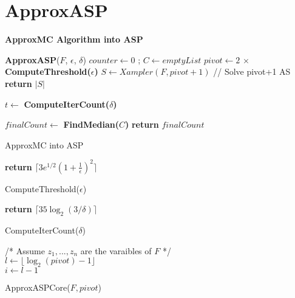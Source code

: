 \section{ApproxASP}

\textbf{ApproxMC Algorithm into ASP}

\begin{algorithm}[h]
\textbf{ApproxASP}($F$, $\epsilon$, $\delta$) \;
\SetAlgoLined
{}
 $counter \gets 0$ ; $C \gets emptyList$\;
 $pivot \gets  2 \, \times $ \textbf{ComputeThreshold($\epsilon$)} \;
 $S \gets Xampler(F, pivot + 1)$ // {Solve pivot+1 AS}  \;
 { %
 \textbf{return} $|S|$  
 } %
 { %
 $t \gets $ \textbf{ComputeIterCount($\delta$)} 
 
 } %
 $finalCount \gets $ \textbf{FindMedian($C$)} \;
 \textbf{return} $finalCount$
 
 \caption{ApproxMC into ASP}
\end{algorithm}


\begin{algorithm}
\textbf{return} $\lceil 3 e^{1/2} (1 + \frac{1}{\epsilon})^2 \rceil$
\caption{ComputeThreshold($\epsilon$)}
\end{algorithm}

\begin{algorithm}
\textbf{return} $\lceil 35 \log_2 (3/\delta) \rceil$
\caption{ComputeIterCount($\delta$)}
\end{algorithm}

\begin{algorithm}
/* Assume $z_1 , ..., z_n $ are the varaibles of $F$ */ \\
$ l \gets \lfloor \log_2 (pivot) - 1 \rfloor$ \\
$ i \gets l - 1$ \\


\caption{ApproxASPCore($F, pivot$)}
\end{algorithm}
